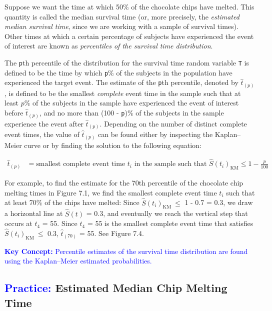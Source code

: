 \documentclass[
]{report}
\begin{document}
Suppose we want the time at which 50\% of the chocolate chips have melted. This quantity is called the median survival time (or, more precisely, the \emph{estimated median survival time}, since we are working with a sample of survival times). Other times at which a certain percentage of subjects have experienced the event of interest are known as \emph{percentiles of the survival time distribution}.

The \texttt{p}th percentile of the distribution for the survival time random variable \texttt{T} is defined to be the time by which \texttt{p}\% of the subjects in the population have experienced the target event. The estimate of the \texttt{p}th percentile, denoted by \(\scriptstyle \hat t_{(p)}\), is defined to be the smallest \emph{complete} event time in the sample such that at least \(p\%\) of the subjects in the sample have experienced the event of interest before \(\scriptstyle \hat t_{(p)}\), and no more than (100 - \texttt{p})\% of the subjects in the sample experience the event after \(\scriptstyle \hat t_{(p)}\). Depending on the number of distinct complete event times, the value of \(\scriptstyle \hat t_{(p)}\) can be found either by inspecting the Kaplan--Meier curve or by finding the solution to the following equation:

\begin{align}\label{9.5}
\hat t_{(p)} &= \text{smallest complete event time }t_i\text{ in the sample such that } \hat S(t_i)_{\mathrm{KM}} \le 1 - \frac{p}{100}
\tag{7.5}
\end{align}

For example, to find the estimate for the 70th percentile of the chocolate chip melting times in Figure 7.1, we find the smallest complete event time \(\scriptstyle t_i\) such that at least 70\% of the chips have melted: Since \(\scriptstyle \hat S(t_i)_{\mathrm{KM}} \ \le\) 1 - 0.7 = 0.3, we draw a horizontal line at \(\scriptstyle \hat S(t)\) = 0.3, and eventually we reach the vertical step that occurs at \(\scriptstyle t_4\) = 55. Since \(\scriptstyle t_4\) = 55 is the smallest complete event time that satisfies \(\scriptstyle \hat S(t_i)_{\mathrm{KM}} \ \le\) 0.3, \(\scriptstyle\hat t_{(70)}\) = 55. See Figure 7.4.

\textbf{\textcolor{blue}{Key Concept:}}
\textcolor{blue}{Percentile estimates of the survival time distribution are found using the Kaplan–Meier estimated probabilities.}

\hypertarget{estimated-median-chip-melting-time}{%
\subsection*{\texorpdfstring{\textcolor{blue}{Practice:} Estimated Median Chip Melting Time}{ Estimated Median Chip Melting Time}}\label{estimated-median-chip-melting-time}}
\end{document}
